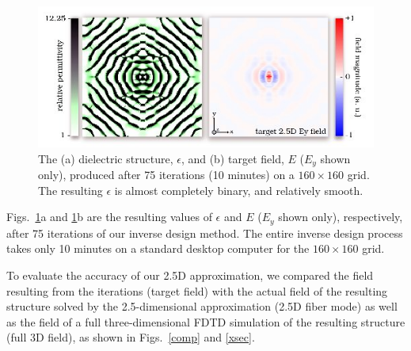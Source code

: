 \begin{figure}[hbt]
\centering\includegraphics[width=\textwidth]{p2/target}
\caption{The (a) dielectric structure, $\epsilon$, and (b) target field, $E$ ($E_y$ shown only), produced after 75 iterations (10 minutes) on a $160\times 160$ grid. The resulting $\epsilon$ is almost completely binary, and relatively smooth.}\label{target}
\end{figure}
Figs.~\ref{target}a and \ref{target}b are the resulting values of $\epsilon$ and $E$ ($E_y$ shown only), respectively, after 75 iterations of our inverse design method. The entire inverse design process takes only 10 minutes on a standard desktop computer for the $160 \times 160$ grid. 

% 
% 
To evaluate the accuracy of our 2.5D approximation, we compared the field resulting from the iterations (target field) with the actual field of the resulting structure solved by the 2.5-dimensional approximation (2.5D fiber mode) as well as the field of a full three-dimensional FDTD simulation of the resulting structure (full 3D field), as shown in Figs.~\ref{comp} and \ref{xsec}.

